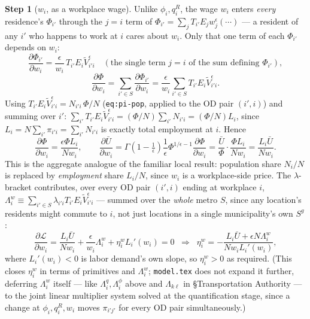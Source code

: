 \documentclass[12pt, a4paper]{article}
\theoremstyle{definition}
\newtheorem{step}{Step}
\begin{document}
\begin{step}[$w_i$, as a workplace wage] Unlike $\phi_i,q_i^R$, the wage $w_i$ enters \emph{every} residence's $\Phi_{i'}$ through the $j=i$ term of $\Phi_{i'}=\sum_j T_{i'}E_jw_j^\epsilon(\cdots)$ — a resident of any $i'$ who happens to work at $i$ cares about $w_i$. Only that one term of each $\Phi_{i'}$ depends on $w_i$:
\[
\frac{\partial \Phi_{i'}}{\partial w_i} = \frac{\epsilon}{w_i}\,T_{i'}E_i\tilde V_{i'i}^\epsilon \quad(\text{the single term } j=i\text{ of the sum defining }\Phi_{i'}),
\]
\[
\frac{\partial\Phi}{\partial w_i} = \sum_{i'\in S}\frac{\partial \Phi_{i'}}{\partial w_i} = \frac{\epsilon}{w_i}\sum_{i'\in S}T_{i'}E_i\tilde V_{i'i}^\epsilon.
\]
Using $T_{i'}E_i\tilde V_{i'i}^\epsilon = N_{i'i}\,\Phi/N$ (\texttt{eq:pi-pop}, applied to the OD pair $(i',i)$) and summing over $i'$: $\sum_{i'}T_{i'}E_i\tilde V_{i'i}^\epsilon = (\Phi/N)\sum_{i'}N_{i'i} = (\Phi/N)L_i$, since $L_i=N\sum_{i'}\pi_{i'i}=\sum_{i'}N_{i'i}$ is exactly total employment at $i$. Hence
\[
\frac{\partial\Phi}{\partial w_i} = \frac{\epsilon\Phi L_i}{Nw_i}, \qquad
\frac{\partial \bar U}{\partial w_i} = \Gamma\!\left(1-\tfrac1\epsilon\right)\frac1\epsilon\Phi^{1/\epsilon-1}\frac{\partial\Phi}{\partial w_i} = \frac{\bar U}{\Phi}\cdot\frac{\Phi L_i}{Nw_i} = \frac{L_i\bar U}{Nw_i}.
\]
This is the aggregate analogue of the familiar local result: population share $N_i/N$ is replaced by \emph{employment} share $L_i/N$, since $w_i$ is a workplace-side price. The $\lambda$-bracket contributes, over every OD pair $(i',i)$ ending at workplace $i$, $\Lambda_i^w\equiv\sum_{i'\in S}\lambda_{i'i}T_{i'}E_i\tilde V_{i'i}^\epsilon$ — summed over the \emph{whole} metro $S$, since any location's residents might commute to $i$, not just locations in a single municipality's own $S^g$:
\[
\frac{\partial\mathcal L}{\partial w_i} = \frac{L_i\bar U}{Nw_i} + \frac{\epsilon}{w_i}\Lambda_i^w + \eta_i^w L_i'(w_i) = 0
\;\;\Longrightarrow\;\;
\eta_i^w = -\frac{L_i\bar U+\epsilon N\Lambda_i^w}{Nw_iL_i'(w_i)},
\]
where $L_i'(w_i)<0$ is labor demand's own slope, so $\eta_i^w>0$ as required. (This closes $\eta_i^w$ in terms of primitives and $\Lambda_i^w$; \texttt{model.tex} does not expand it further, deferring $\Lambda_i^w$ itself — like $\Lambda_i^q,\Lambda_i^\phi$ above and $\Lambda_{k\ell}$ in \S Transportation Authority — to the joint linear multiplier system solved at the quantification stage, since a change at $\phi_i,q_i^R,w_i$ moves $\pi_{i'j'}$ for every OD pair simultaneously.)
\end{step}
\end{document}
